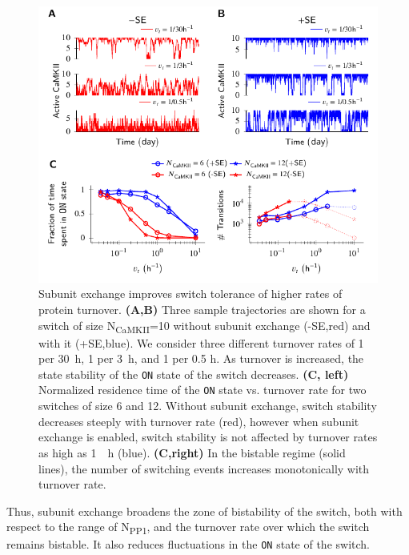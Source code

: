 \documentclass[9pt,lineno,doublespacing]{elife}
\newcommand\SUB[2]{#1\textsubscript{#2}}
\begin{document}
\begin{figure}[th!]
    \includegraphics[width=114mm]{./PaperFigures/elifeFigure3/figure_turnover_tolerance_114.pdf}
    \caption{Subunit exchange improves switch tolerance of higher rates of
        protein turnover.
        \textbf{(A,B)} Three sample trajectories are shown for a switch of 
        size \SUB{N}{CaMKII}=10 without subunit exchange
        (-SE,red) and with it (+SE,blue). We consider three different 
        turnover rates of 1 per \SI{30}{\hour}, 1 per \SI{3}{\hour}, 
        and 1 per 0.5 \si{\hour}. As turnover is increased, the state stability 
        of the \texttt{ON} state of the switch decreases.
        \textbf{(C, left)} Normalized residence time of the \texttt{ON} state vs. turnover
        rate for two switches of size 6 and 12. Without subunit exchange, switch
        stability decreases steeply with turnover rate (red), however when
        subunit exchange is enabled, switch stability is not affected by
        turnover rates as high as \SI{1}{\per \hour} (blue). \textbf{(C,right)} In
        the bistable regime (solid lines), the number of switching events
        increases monotonically with turnover rate.
    }\label{fig:turnover}
\end{figure}

Thus, subunit exchange broadens the zone of bistability of the switch,
both with respect to the range of \SUB{N}{PP1}, and the turnover rate
over which the switch remains bistable. It also reduces fluctuations in the
 \texttt{ON} state of the switch.
\end{document}
